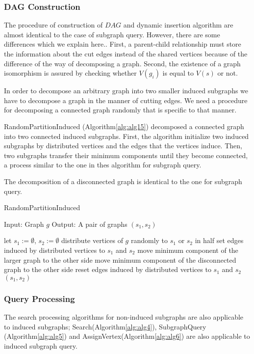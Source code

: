\subsubsection{DAG Construction}
The procedure of construction of $DAG$ and dynamic insertion algorithm are almost identical to the case of subgraph query.
However, there are some differences which we explain here..
First, a parent-child relationship must store the information about the cut edges instead of the shared vertices because of the difference of the way of decomposing a graph.
Second, the existence of a graph isomorphism is assured by checking whether $V(g_i)$ is equal to $V(s)$ or not.

In order to decompose an arbitrary graph into two smaller induced subgraphs we have to decompose a graph in the manner of cutting edges.
 We need a procedure for decomposing a connected graph randomly that is specific to that manner.

RandomPartitionInduced (Algorithm\ref{alg:alg15}) decomposed a connected graph into two connected induced subgraphs.
First, the algorithm initialize two induced subgraphs by distributed vertices and the edges that the vertices induce.
Then, two subgraphs transfer their minimum components until they become connected, a process similar to the one in thes algorithm for subgraph query.

The decomposition of a disconnected graph is identical to the one for subgraph query.

\begin{algorithm}
\caption{RandomPartitionInduced}
\label{alg:alg15}
\begin{algorithmic}
\STATE Input: Graph $g$
\STATE Output: A pair of graphs $(s_1, s_2)$
\end{algorithmic}
\begin{algorithmic}[1]
\STATE let $s_1 := \emptyset$, $s_2 := \emptyset$
\STATE distribute vertices of $g$ randomly to $s_1$ or $s_2$ in half
\STATE set edges induced by distributed vertices to $s_1$ and $s_2$ 
\REPEAT
		\STATE move minimum component of the larger graph to the other side
	\ELSE
		\STATE move minimum component of the disconnected graph to the other side
	\ENDIF
	\STATE reset edges induced by distributed vertices to $s_1$ and $s_2$ 
\RETURN $(s_1,s_2)$
\end{algorithmic}
\end{algorithm}

\subsubsection{Query Processing}
The search processing algorithms for non-induced subgraphs are also applicable to induced subgraphs;
Search(Algorithm\ref{alg:alg4}), SubgraphQuery (Algorithm\ref{alg:alg5}) and AssignVertex(Algorithm\ref{alg:alg6}) are also applicable to induced subgraph query.

